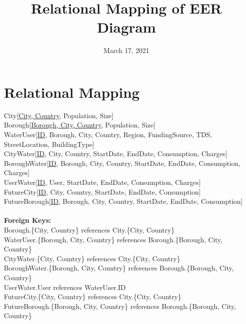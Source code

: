 \documentclass{article}
\title{Relational Mapping of EER Diagram}
\date{March 17, 2021}
\begin{document}
\maketitle


\section{Relational Mapping}
City[\underline{City, Country}, Population, Size] \\
Borough[\underline{Borough, City, Country}, Population, Size] \\
WaterUser[\underline{ID}, Borough, City, Country, Region, FundingSource, TDS, StreetLocation, BuildingType] \\
CityWater[\underline{ID}, City, Country, StartDate, EndDate, Consumption, Charges] \\
BoroughWater[\underline{ID}, Borough, City, Country, StartDate, EndDate, Consumption, Charges] \\
UserWater[\underline{ID}, User, StartDate, EndDate, Consumption, Charges] \\
FutureCity[\underline{ID}, City, Country, StartDate, EndDate, Consumption] \\
FutureBorough[\underline{ID}, Borough, City, Country, StartDate, EndDate, Consumption]
\\~\\
\textbf{Foreign Keys:} \\
Borough.\{City, Country\} references City.\{City, Country\} \\
WaterUser.\{Borough, City, Country\} references Borough.\{Borough, City, Country\} \\
CityWater.\{City, Country\} references City.\{City, Country\} \\
BoroughWater.\{Borough, City, Country\} references Borough.\{Borough, City, Country\} \\
UserWater.User references WaterUser.ID \\
FutureCity.\{City, Country\} references City.\{City, Country\} \\
FutureBorough.\{Borough, City, Country\} references Borough.\{Borough, City, Country\} \\
\end{document}
